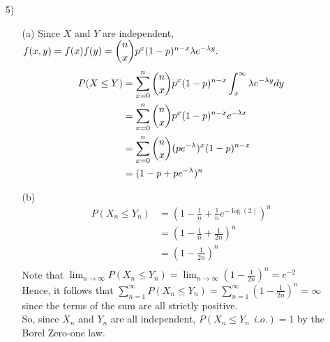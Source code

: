 \begin{enumerate}
\item[5)]
\begin{itemize}
\item[(a)] Since $X$ and $Y$ are independent, $f(x,y)=f(x)f(y) = \dbinom{n}{x}p^{x}(1-p)^{n-x} \lambda e^{-\lambda y}.$\\
\begin{align*}
P(X \leq Y)& = \sum_{x=0}^{n} \dbinom{n}{x}p^{x}(1-p)^{n-x} \int_{x}^{\infty} \lambda e^{-\lambda y} dy\\ 
&= \sum_{x=0}^{n} \dbinom{n}{x}p^{x}(1-p)^{n-x} e^{-\lambda x} 
\\&=  \sum_{x=0}^{n} \dbinom{n}{x}(pe^{-\lambda})^{x}(1-p)^{n-x} 
\\ &=(1 - p + pe^{-\lambda})^{n}
\end{align*}

\item[(b)]  \begin{align*} P(X_{n} \leq Y_{n}) &= (1 - \frac{1}{n} + \frac{1}{n}e^{-\log(2)})^{n} \\
&=  (1 - \frac{1}{n} + \frac{1}{2n})^{n} \\
&= (1 - \frac{1}{2n})^{n}\\
\end{align*}
Note that  $\lim_{n \rightarrow \infty} P(X_{n} \leq Y_{n}) = \lim_{n \rightarrow \infty} (1 - \frac{1}{2n})^{n} = e^{-2}$\\
Hence, it follows that $\sum_{n=1}^{\infty} P(X_{n} \leq Y_{n}) = \sum_{n=1}^{\infty} (1 - \frac{1}{2n})^{n} = \infty$ since the terms of the sum are all strictly positive.\\ 
So, since $X_{n}$ and $Y_{n}$ are all independent, $P(X_{n} \leq Y_{n} \ \ i.o.) = 1$ by the Borel Zero-one law. 
\end{itemize}
\end{enumerate}